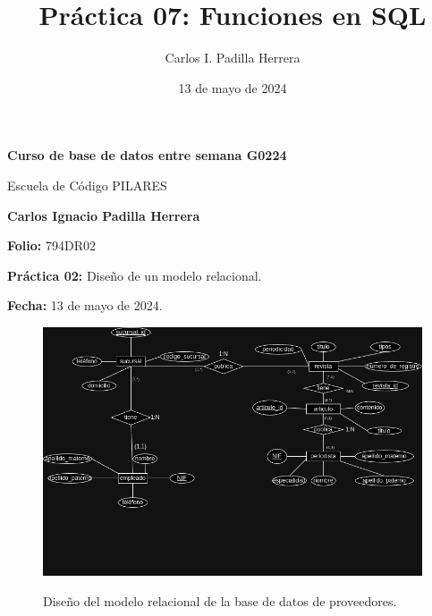 \documentclass{article}
\title{Práctica 07: Funciones en SQL}
\author{Carlos I. Padilla Herrera}
\date{13 de mayo de 2024}
\begin{document}
\begin{titlepage}
    \centering
    \vspace*{1cm}
    \Huge\textbf{Curso de base de datos entre semana G0224}
    
    \vspace{0.5cm}
    \LARGE Escuela de Código PILARES
    
    \vspace{1.5cm}
    \textbf{Carlos Ignacio Padilla Herrera}
    
    \vspace{2cm}
    \Large\textbf{Folio:} 794DR02
    
    \vspace{0.5cm}
    \Large\textbf{Práctica 02:} Diseño de un modelo relacional.
    
    \vfill
    
    \Large\textbf{Fecha:} 13 de mayo de 2024.
    
    \vspace{0.8cm}
\end{titlepage}

\begin{figure}[ht]
    \centering
    {
        \includegraphics[width=\linewidth]{02practica.png} %
    }
    \caption{Diseño del modelo relacional de la base de datos de proveedores.}
\end{figure}

\newpage
\end{document}
